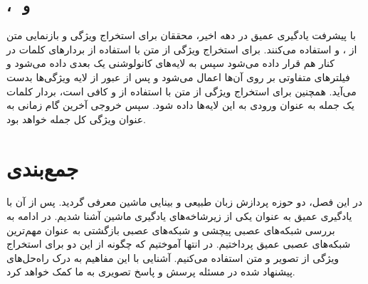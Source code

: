 \subsection{‌، ‌‌ و }
	با پیشرفت یادگیری عمیق در دهه اخیر، محققان برای استخراج ویژگی و بازنمایی متن از
	،
	\cite{hochreiter1997long}
	و
	\cite{cho2014learning}
	استفاده می‌کنند. برای استخراج ویژگی از متن با استفاده از 
	بردارهای کلمات در کنار هم قرار داده می‌شود سپس به لایه‌های کانولوشنی یک بعدی داده می‌شود و فیلتر‌های متفاوتی بر روی آن‌ها اعمال می‌شود و پس از عبور از لایه‌ 
	ویژگی‌ها بدست می‌آید. همچنین برای استخراج ویژگی از متن با استفاده از 
	و
	کافی است، بردار کلمات یک جمله به عنوان ورودی به این لایه‌ها داده شود. سپس خروجی آخرین گام زمانی به عنوان ویژگی کل جمله خواهد بود. 
	
\section{جمع‌بندی}
در این فصل، دو حوزه پردازش زبان طبیعی و بینایی ماشین معرفی گردید. پس از آن با یادگیری عمیق به عنوان یکی از زیرشاخه‌های یادگیری ماشین آشنا شدیم. در ادامه به بررسی شبکه‌های عصبی پیچشی و شبکه‌های عصبی بازگشتی به عنوان مهم‌ترین شبکه‌های عصبی عمیق پرداختیم. در انتها آموختیم که چگونه از این دو برای استخراج ویژگی از تصویر و متن استفاده می‌کنیم. آشنایی با این مفاهیم به درک راه‌حل‌های پیشنهاد شده در مسئله پرسش و پاسخ تصویری به ما کمک خواهد کرد.



